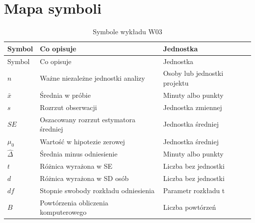 \documentclass[
  polish,
  11pt,
  a4paper,
]{article}
\begin{document}
\section{Mapa symboli}\label{mapa-symboli}

\begin{longtable}[]{@{}
  >{\raggedright\arraybackslash}p{}
  >{\raggedright\arraybackslash}p{}
  >{\raggedright\arraybackslash}p{}@{}}
\caption{Symbole wykładu W03}\tabularnewline
\toprule\noalign{}
\begin{minipage}[b]{\linewidth}\raggedright
Symbol
\end{minipage} & \begin{minipage}[b]{\linewidth}\raggedright
Co opisuje
\end{minipage} & \begin{minipage}[b]{\linewidth}\raggedright
Jednostka
\end{minipage} \\
\midrule\noalign{}
\endfirsthead
\toprule\noalign{}
\begin{minipage}[b]{\linewidth}\raggedright
Symbol
\end{minipage} & \begin{minipage}[b]{\linewidth}\raggedright
Co opisuje
\end{minipage} & \begin{minipage}[b]{\linewidth}\raggedright
Jednostka
\end{minipage} \\
\midrule\noalign{}
\endhead
\bottomrule\noalign{}
\endlastfoot
\(n\) & Ważne niezależne jednostki analizy & Osoby lub jednostki
projektu \\
\(\bar{x}\) & Średnia w próbie & Minuty albo punkty \\
\(s\) & Rozrzut obserwacji & Jednostka zmiennej \\
\(SE\) & Oszacowany rozrzut estymatora średniej & Jednostka średniej \\
\(\mu_0\) & Wartość w hipotezie zerowej & Jednostka średniej \\
\(\widehat\Delta\) & Średnia minus odniesienie & Minuty albo punkty \\
\(t\) & Różnica wyrażona w SE & Liczba bez jednostki \\
\(d\) & Różnica wyrażona w SD osób & Liczba bez jednostki \\
\(df\) & Stopnie swobody rozkładu odniesienia & Parametr rozkładu t \\
\(B\) & Powtórzenia obliczenia komputerowego & Liczba powtórzeń \\
\end{longtable}
\end{document}
